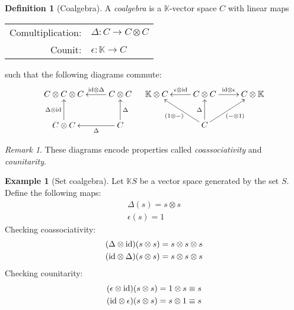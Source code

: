 \documentclass{article}
\theoremstyle{definition}
\newtheorem{Definition}{Definition}
\newtheorem{Example}{Example}
\theoremstyle{remark}
\newtheorem*{Remark*}{Remark}
\theoremstyle{underline}
\theoremstyle{underline}
\newcommand{\id}{\mathrm{id}}
\begin{document}
	\begin{Definition}[Coalgebra]
		A \emph{coalgebra} is a $\mathbb K$-vector space $C$ with linear maps
		\begin{center}
			\begin{tabular}{rl}
		 		Comultiplication: & $\Delta \colon C \rightarrow C \otimes C$ \\
		 		Counit: & $ \epsilon \colon \mathbb K \rightarrow C$ 
		\end{tabular}
		\end{center}
		such that the following diagrams commute:
		\begin{align*}
		\xymatrix{
			C \otimes C \otimes C & C \otimes C \ar[l]_-{\id \otimes \Delta} \\
			C \otimes C \ar[u]^-{\Delta \otimes \id} & C \ar[l]^-{\Delta} \ar[u]_-{\Delta}
		} & &
		\xymatrix{
			\mathbb K \otimes C  & C \otimes C \ar[l]_-{\epsilon \otimes \id} \ar[r]^-{\id \otimes \epsilon} & C \otimes \mathbb K  \\
			& C \ar[u]^-{\Delta} \ar[lu]^-{\pqty{1 \otimes -}} \ar[ru]_-{\pqty{- \otimes 1}} &	
		}
		\end{align*}
	\end{Definition}
	\begin{Remark*}
		These diagrams encode properties called \emph{coassociativity} and \emph{counitarity}.
	\end{Remark*}
	\begin{Example}[Set coalgebra]
		Let $\mathbb K S$ be a vector space generated by the set $S$. Define the following maps:
		\begin{gather*}
			\Delta(s) = s\otimes s \\
			\epsilon(s) = 1 
		\end{gather*}
		Checking coassociativity:
		\begin{gather*}
			\pqty{\Delta \otimes \id} \pqty{s \otimes s} = s \otimes s \otimes s \\
			\pqty{\id \otimes \Delta} \pqty{s \otimes s} = s \otimes s \otimes s 
		\end{gather*}
		Checking counitarity:
		\begin{gather*}
			\pqty{\epsilon \otimes \id} \pqty{s \otimes s} = 1 \otimes s \equiv s \\
			\pqty{\id \otimes \epsilon} \pqty{s \otimes s} = s \otimes 1 \equiv s
		\end{gather*}
	\end{Example}
\end{document}
